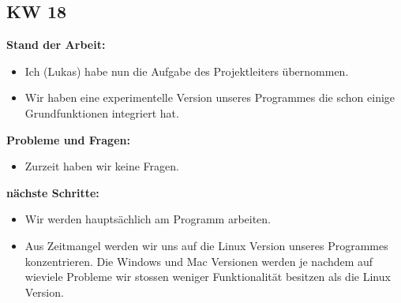 \documentclass[10pt,paper=a4,final]{scrartcl}
\begin{document}
\subsection{KW 18}
\begin{description}
  \item {\bf Stand der Arbeit: } \\
    \begin{itemize}
      \item Ich (Lukas) habe nun die Aufgabe des Projektleiters übernommen.
      \item Wir haben eine experimentelle Version unseres Programmes die schon einige Grundfunktionen integriert hat.
    \end{itemize}
  \item {\bf Probleme und Fragen: } \\
    \begin{itemize}
      \item Zurzeit haben wir keine Fragen.
    \end{itemize}
  \item {\bf nächste Schritte: } \\
    \begin{itemize}
      \item Wir werden hauptsächlich am Programm arbeiten.
      \item Aus Zeitmangel werden wir uns auf die Linux Version unseres Programmes konzentrieren. Die Windows und Mac Versionen werden je nachdem auf wieviele Probleme wir stossen weniger Funktionalität besitzen als die Linux Version.
    \end{itemize}
\end{description}
\end{document}
